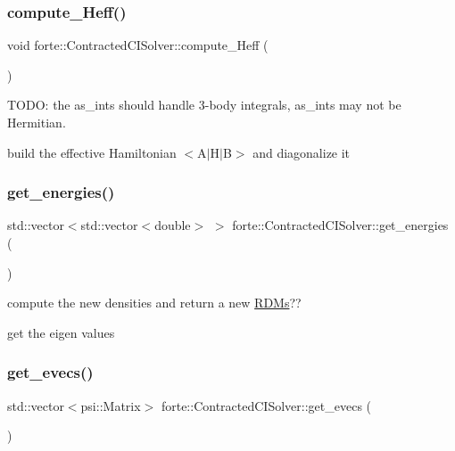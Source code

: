\subsubsection{\texorpdfstring{compute\+\_\+\+Heff()}{compute\_Heff()}}
{\footnotesize\ttfamily void forte\+::\+Contracted\+C\+I\+Solver\+::compute\+\_\+\+Heff (\begin{DoxyParamCaption}{ }\end{DoxyParamCaption})}



T\+O\+DO\+: the as\+\_\+ints should handle 3-\/body integrals, as\+\_\+ints may not be Hermitian. 

build the effective Hamiltonian $<$A$\vert$\+H$\vert$B$>$ and diagonalize it \mbox{\label{classforte_1_1_contracted_c_i_solver_a06f7a3526d04daf00f8ec663b48f2d01}} 
\subsubsection{\texorpdfstring{get\+\_\+energies()}{get\_energies()}}
{\footnotesize\ttfamily std\+::vector$<$std\+::vector$<$double$>$ $>$ forte\+::\+Contracted\+C\+I\+Solver\+::get\+\_\+energies (\begin{DoxyParamCaption}{ }\end{DoxyParamCaption})\hspace{0.3cm}{\ttfamily [inline]}}



compute the new densities and return a new \mbox{\hyperlink{classforte_1_1_r_d_ms}{R\+D\+Ms}}?? 

get the eigen values \mbox{\label{classforte_1_1_contracted_c_i_solver_ad3d7712cb2485dde8b3fbb9b8e47b657}} 
\subsubsection{\texorpdfstring{get\+\_\+evecs()}{get\_evecs()}}
{\footnotesize\ttfamily std\+::vector$<$psi\+::\+Matrix$>$ forte\+::\+Contracted\+C\+I\+Solver\+::get\+\_\+evecs (\begin{DoxyParamCaption}{ }\end{DoxyParamCaption})\hspace{0.3cm}{\ttfamily [inline]}}




